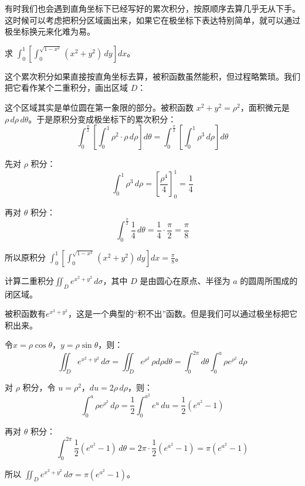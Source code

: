 有时我们也会遇到直角坐标下已经写好的累次积分，按原顺序去算几乎无从下手。这时候可以考虑把积分区域画出来，如果它在极坐标下表达特别简单，就可以通过极坐标换元来化难为易。

\begin{myexample}
    求 \(\int_0^1\left[\int_0^{\sqrt{1-x^2}} (x^2+y^2)\,dy\right]dx\)。

    这个累次积分如果直接按直角坐标去算，被积函数虽然能积，但过程略繁琐。我们把它看作某个二重积分，画出区域 \(D\)：

    \begin{center}
    \end{center}

    这个区域其实是单位圆在第一象限的部分。被积函数 \(x^2+y^2=\rho^2\)，面积微元是 \(\rho\,d\rho\,d\theta\)。于是原积分变成极坐标下的累次积分：
    \[
    \int_0^{\frac{\pi}{2}}\left[\int_0^1 \rho^2\cdot \rho\,d\rho\right]d\theta
    = \int_0^{\frac{\pi}{2}}\left[\int_0^1 \rho^3\,d\rho\right]d\theta
    \]

    先对 \(\rho\) 积分：
    \[
    \int_0^1 \rho^3\,d\rho = \left[\frac{\rho^4}{4}\right]_0^1 = \frac14
    \]

    再对 \(\theta\) 积分：
    \[
    \int_0^{\frac{\pi}{2}} \frac14\,d\theta = \frac14\cdot\frac{\pi}{2} = \frac{\pi}{8}
    \]

    所以原积分 \(\int_0^1\left[\int_0^{\sqrt{1-x^2}} (x^2+y^2)\,dy\right]dx = \frac{\pi}{8}\)。
\end{myexample}

\begin{myexample}
    计算二重积分$\iint_D e^{x^2+y^2}\,d\sigma$，其中 $D$ 是由圆心在原点、半径为 $a$ 的圆周所围成的闭区域。

    被积函数有$e^{x^2+y^2}$，这是一个典型的“积不出”函数。但是我们可以通过极坐标把它积出来。

    令$x = \rho\cos\theta$，$y = \rho\sin\theta$，则：
\[
\iint_D e^{x^2+y^2}\,d\sigma = \iint_D e^{\rho^2}\,\rho d\rho d\theta
= \int_0^{2\pi} d\theta \int_0^a \rho e^{\rho^2} \,d\rho
\]

对 $\rho$ 积分，令 $u = \rho^2$，$du = 2\rho\,d\rho$，则：
\[
\int_0^a \rho e^{\rho^2}\,d\rho = \frac{1}{2} \int_0^{a^2} e^u\,du
= \frac{1}{2}(e^{a^2} - 1)
\]

再对 $\theta$ 积分：
\[
\int_0^{2\pi} \frac{1}{2}(e^{a^2} - 1)\, d\theta = 2\pi \cdot \frac{1}{2}(e^{a^2} - 1) =\pi(e^{a^2} - 1)
\]

所以
\(\iint_D e^{x^2+y^2}\,d\sigma
= \pi(e^{a^2} - 1)\)。
\end{myexample}

